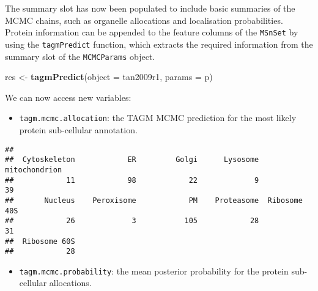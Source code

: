 \documentclass[9pt,a4paper,]{extarticle}
\newenvironment{Shaded}{\begin{snugshade}}{\end{snugshade}}
\newcommand{\DataTypeTok}[1]{\textcolor[rgb]{0.13,0.29,0.53}{#1}}
\newcommand{\KeywordTok}[1]{\textcolor[rgb]{0.13,0.29,0.53}{\textbf{#1}}}
\newcommand{\NormalTok}[1]{#1}
\newcommand{\OperatorTok}[1]{\textcolor[rgb]{0.81,0.36,0.00}{\textbf{#1}}}
\newcommand{\StringTok}[1]{\textcolor[rgb]{0.31,0.60,0.02}{#1}}
\begin{document}
The summary slot has now been populated to include basic summaries of
the MCMC chains, such as organelle allocations and localisation
probabilities. Protein information can be appended to the feature
columns of the \texttt{MSnSet} by using the \texttt{tagmPredict} function, which
extracts the required information from the summary slot of the
\texttt{MCMCParams} object.

\begin{Shaded}
\begin{Highlighting}[]
\NormalTok{res <-}\StringTok{ }\KeywordTok{tagmPredict}\NormalTok{(}\DataTypeTok{object =}\NormalTok{ tan2009r1, }\DataTypeTok{params =}\NormalTok{ p)}
\end{Highlighting}
\end{Shaded}

We can now access new variables:

\begin{itemize}
\item
  \texttt{tagm.mcmc.allocation}: the TAGM MCMC prediction for the most likely
  protein sub-cellular annotation.
\end{itemize}

\begin{Shaded}
\end{Shaded}

\begin{verbatim}
## 
##  Cytoskeleton            ER         Golgi      Lysosome mitochondrion 
##            11            98            22             9            39 
##       Nucleus    Peroxisome            PM    Proteasome  Ribosome 40S 
##            26             3           105            28            31 
##  Ribosome 60S 
##            28
\end{verbatim}

\begin{itemize}
\item
  \texttt{tagm.mcmc.probability}: the mean posterior probability for the protein
  sub-cellular allocations.
\end{itemize}

\begin{Shaded}
\end{Shaded}
\end{document}
